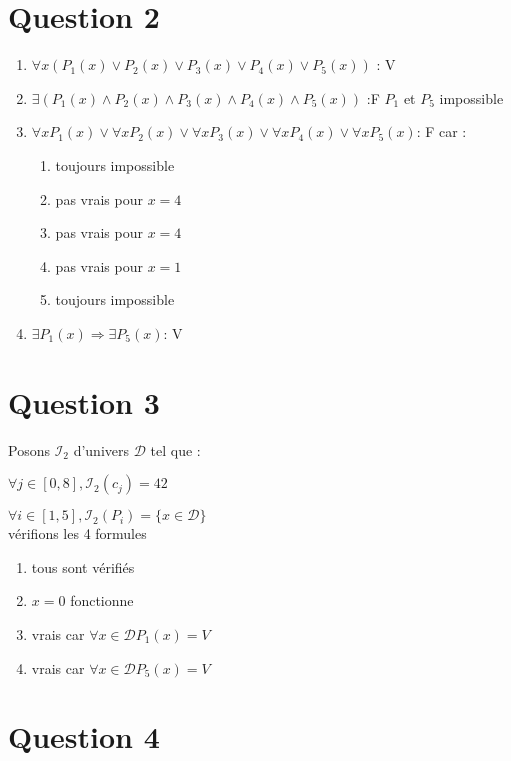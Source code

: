 \documentclass[12pt]{report}
\begin{document}
\section{Question 2}

\begin{enumerate}
\item $\forall x (P_1(x) \vee P_2(x) \vee P_3(x) \vee P_4(x) \vee P_5(x))$ : V
\item $\exists (P_1(x) \wedge P_2(x) \wedge P_3(x) \wedge P_4(x) \wedge P_5(x))$ :F $P_1$ et $P_5$ impossible
\item $\forall x P_1(x) \vee \forall x P_2(x) \vee \forall x P_3(x) \vee \forall x P_4(x) \vee \forall x P_5(x)$: F car : \begin{enumerate}
\item toujours impossible
\item pas vrais pour $x = 4$
\item pas vrais pour $x = 4$
\item pas vrais pour $x =1$
\item toujours impossible
\end{enumerate} 
\item $\exists P_1(x) \Rightarrow \exists P_5(x)$: V
\end{enumerate}

\section{Question 3}

Posons $\mathcal{I}_2$ d'univers $\mathcal{D}$ tel que :

$\forall j \in [0,8] ,\mathcal{I}_2(c_j) = 42$

$\forall i \in [1,5], \mathcal{I}_2(P_i) = \lbrace x \in \mathcal{D}  \rbrace$\\

vérifions les 4 formules
\begin{enumerate}
 \item  tous sont vérifiés 
 \item $x=0$ fonctionne
 \item vrais car $\forall x \in \mathcal{D} P_1(x) = V$
 \item vrais car $\forall x \in \mathcal{D} P_5(x) = V$
\end{enumerate}

\section{Question 4}
\end{document}
